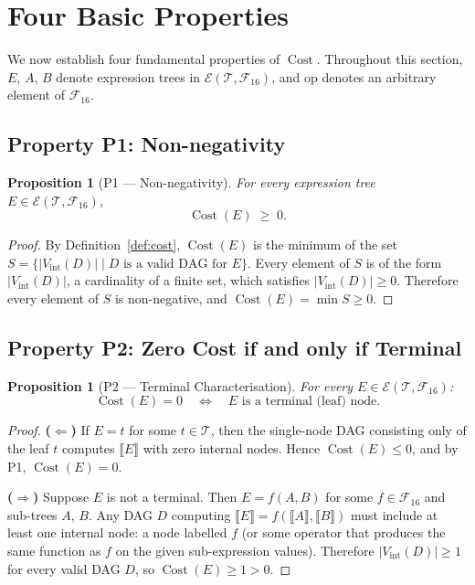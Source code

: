 \documentclass[12pt,a4paper]{article}
\newtheorem{proposition}[theorem]{Proposition}
\theoremstyle{definition}
\newcommand{\Cost}{\operatorname{Cost}}
\newcommand{\Fam}{\mathcal{F}}
\begin{document}
\section{Four Basic Properties}
\label{sec:props}

We now establish four fundamental properties of $\Cost$.  Throughout this
section, $E$, $A$, $B$ denote expression trees in
$\mathcal{E}(\mathcal{T}, \Fam_{16})$, and $\mathrm{op}$ denotes an arbitrary
element of $\Fam_{16}$.

\subsection{Property P1: Non-negativity}

\begin{proposition}[P1 --- Non-negativity]
\label{prop:P1}
For every expression tree $E \in \mathcal{E}(\mathcal{T},\Fam_{16})$,
\[
  \Cost(E) \;\geq\; 0.
\]
\end{proposition}

\begin{proof}
By Definition~\ref{def:cost}, $\Cost(E)$ is the minimum of the set
$S = \{|V_{\mathrm{int}}(D)| \mid D \text{ is a valid DAG for } E\}$.
Every element of $S$ is of the form $|V_{\mathrm{int}}(D)|$, a cardinality of
a finite set, which satisfies $|V_{\mathrm{int}}(D)| \geq 0$.  Therefore every
element of $S$ is non-negative, and $\Cost(E) = \min S \geq 0$.
\end{proof}

\subsection{Property P2: Zero Cost if and only if Terminal}

\begin{proposition}[P2 --- Terminal Characterisation]
\label{prop:P2}
For every $E \in \mathcal{E}(\mathcal{T},\Fam_{16})$:
\[
  \Cost(E) = 0
  \quad\iff\quad
  E \text{ is a terminal (leaf) node}.
\]
\end{proposition}

\begin{proof}
\textbf{($\Leftarrow$)}
If $E = t$ for some $t \in \mathcal{T}$, then the single-node DAG consisting
only of the leaf $t$ computes $\llbracket E \rrbracket$ with zero internal
nodes.  Hence $\Cost(E) \leq 0$, and by P1, $\Cost(E) = 0$.

\textbf{($\Rightarrow$)}
Suppose $E$ is not a terminal.  Then $E = f(A, B)$ for some $f \in \Fam_{16}$
and sub-trees $A$, $B$.  Any DAG $D$ computing $\llbracket E \rrbracket
= f(\llbracket A \rrbracket, \llbracket B \rrbracket)$ must include at least
one internal node: a node labelled $f$ (or some operator that produces the same
function as $f$ on the given sub-expression values).  Therefore
$|V_{\mathrm{int}}(D)| \geq 1$ for every valid DAG $D$, so $\Cost(E) \geq 1
> 0$.
\end{proof}
\end{document}
